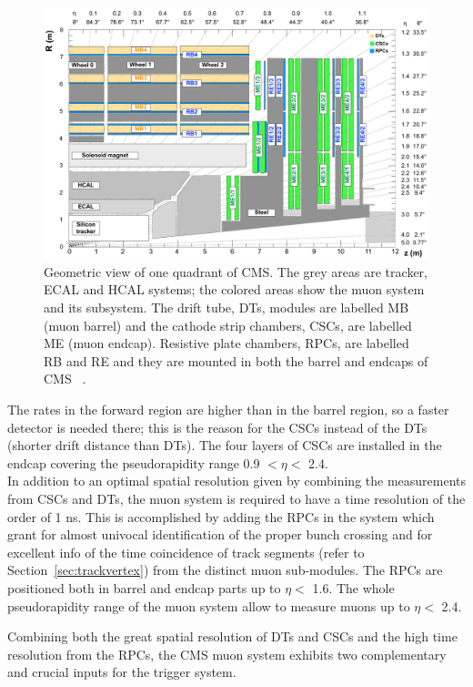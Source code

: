 \begin{figure}[h!]
\centering
\includegraphics[width=0.999\textwidth]{Figures/c2/cms_quadrant_run_ii.pdf}
\caption{Geometric view of one quadrant of CMS. The grey areas are
  tracker, ECAL and HCAL systems; the colored
  areas show the muon system and its subsystem. The drift tube, DTs,
  modules are labelled MB (muon barrel) and the cathode strip
  chambers, CSCs, are labelled ME (muon endcap). Resistive plate
  chambers, RPCs, are labelled RB and RE and they are mounted in both the barrel and endcaps of CMS
~\cite{muonsystemPU}. }
\label{fig:muonsystem}
\end{figure} 

The rates in the forward region are higher than in the
barrel region, so a faster detector is needed there; this is the
reason for the CSCs instead of the DTs (shorter drift distance than DTs).
The four layers of
CSCs are installed in the endcap covering the pseudorapidity range 0.9
$<\eta<$ 2.4. \\
In addition to an optimal spatial resolution given by combining the
measurements from CSCs and DTs, the muon system is required to have a time resolution of
the order of 1 ns. This is accomplished by adding the RPCs in the system
which grant for almost univocal identification of the proper bunch
crossing and for excellent info of the time coincidence of track
segments (refer to Section~\ref{sec:trackvertex}) from the distinct
muon sub-modules. 
The RPCs are positioned both in barrel
and endcap parts up to $\eta<$ 1.6. The whole pseudorapidity range of
the muon system allow to measure muons up to $\eta<$ 2.4.

Combining both the great spatial resolution of DTs and CSCs and the
high time resolution from the RPCs,
 the CMS muon system exhibits two
complementary and crucial inputs for the trigger system. 

